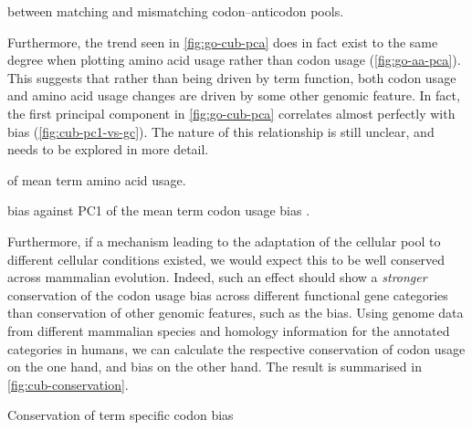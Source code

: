     {\tai between matching and mismatching codon--anticodon pools.}
    {}


Furthermore, the trend seen in \cref{fig:go-cub-pca} does in fact exist to the
same degree when plotting amino acid usage rather than codon usage
(\cref{fig:go-aa-pca}). This suggests that rather than being driven by \go term
function, both codon usage and amino acid usage changes are driven by some other
genomic feature. In fact, the first principal component in \cref{fig:go-cub-pca}
correlates almost perfectly with \gc bias (\cref{fig:cub-pc1-vs-gc}). The nature
of this relationship is still unclear, and needs to be explored in more detail.

    {\pca of mean \go term amino acid usage.}
    {}

    {\gc bias against PC1 of the mean \go term codon usage bias \pca.}
    {}

Furthermore, if a mechanism leading to the adaptation of the cellular \trna pool
to different cellular conditions existed, we would expect this to be well
conserved across mammalian evolution. Indeed, such an effect should show a
\emph{stronger} conservation of the codon usage bias across different functional
gene categories than conservation of other genomic features, such as the \gc
bias. Using genome data from different mammalian species and homology
information for the annotated \go categories in humans, we can calculate the
respective conservation of codon usage on the one hand, and \gc bias on the
other hand. The result is summarised in \cref{fig:cub-conservation}.

    {Conservation of \go term specific codon bias}
    {}
